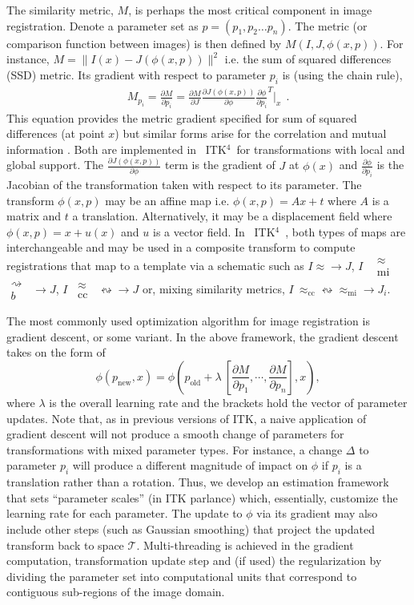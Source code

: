 \documentclass{frontiersSCNS}
\newcommand{\bsp}{$\substack{
   \rightsquigarrow \\
   b
  }$}
\newcommand{\mi}{$\substack{
   \approx \\
   \text{mi}
  }$}
\newcommand{\cc}{$\substack{
   \approx \\
   \text{cc}
  }$}
\newcommand{\tk}{~ITK$^{\text{4}}$~}
\begin{document}
The similarity metric, $M$, is perhaps the most critical component in image registration.  
Denote a parameter set as $p = (p_1, p_2 \ldots p_n)$.  
The metric (or comparison function between images) is then defined by $M(I,J,\phi(x,p))$.  For instance, $M=\|
I(x)-J(\phi(x,p)) \|^2$ i.e. the sum of squared differences (SSD) metric. Its gradient with respect to parameter $p_i$
is (using the chain rule), 
\begin{eqnarray}
 M_{p_i}=\frac{\partial M}{\partial
  p_i}=\frac{\partial M}{\partial J}\frac{\partial
  J(\phi(x,p))}{\partial \phi} \frac{\partial \phi}{\partial p_i}^T|_x
~~.
\label{eq:grad}
\end{eqnarray}
This equation provides the metric gradient specified for
sum of squared differences (at point $x$) but similar forms arise for the correlation
and mutual information \cite{hermosillo}.  Both are implemented in
\tk for transformations with local and global support.  The
$\frac{\partial J(\phi(x,p))}{\partial \phi}$ term is the gradient of $J$ at $\phi(x)$
and $\frac{\partial \phi}{\partial p_i}$ is the Jacobian of the transformation taken
with respect to its parameter.   The transform $\phi(x,p)$ may be
an affine map i.e. $\phi(x,p)=A x + t$ where $A$ is a matrix and
$t$ a translation.  Alternatively, it may be a displacement field
where $\phi(x,p)=x+u(x)$ and
$u$ is a vector field.  In \tk, both types of maps are interchangeable
and may be used in a composite transform to compute registrations that
map to a template via a schematic such as $ I \approx \rightarrow J $, $ I $ ~\mi~\bsp~$
\rightarrow  J $, $ I $~\cc~$ \leftrightsquigarrow \rightarrow J $
or, mixing similarity metrics, $I
~\approx_\text{cc}  \leftrightsquigarrow \approx_\text{mi}  \rightarrow
J_i $.  

The most commonly used optimization algorithm for image registration
is gradient descent, or some variant.   In the above framework, the
gradient descent takes on the form of
$$
\phi(p_\text{new},x)=\phi(p_\text{old}+\lambda~[ \frac{\partial
  M}{\partial p_1} , \cdots , \frac{\partial
  M}{\partial p_n} ] ,  x ),
$$
where $\lambda$ is the overall learning rate and the brackets hold the
vector of parameter updates.  Note that, as in previous versions of
ITK, a naive application of gradient descent will not produce a smooth
change of parameters for transformations with mixed parameter types.
For instance, a change $\Delta$ to parameter $p_i$ will produce a
different magnitude of impact on $\phi$ if $p_i$ is a translation rather than a
rotation.  Thus, we develop an estimation framework that sets
``parameter scales'' (in ITK parlance) which, essentially, customize
the learning rate for each parameter.  The update to
$\phi$ via its gradient may also include other steps (such as Gaussian
smoothing) that project the updated transform back to space
$\mathcal{T}$.  Multi-threading is achieved in the gradient computation, transformation update
step and (if used) the regularization by dividing the parameter set
into computational units that correspond to contiguous sub-regions of the image domain.
\end{document}
